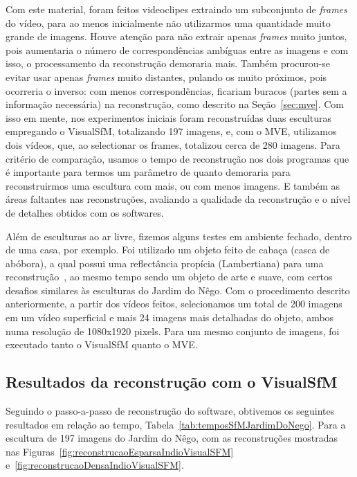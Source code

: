 Com este material, foram feitos videoclipes extraindo um subconjunto de
\emph{frames} do vídeo, para ao menos inicialmente não utilizarmos uma quantidade muito
grande de imagens. Houve atenção para não extrair apenas \emph{frames} muito
juntos, pois aumentaria o número de correspondências ambíguas entre as imagens e
com isso, o processamento da reconstrução demoraria mais. Também procurou-se 
evitar usar apenas \emph{frames} muito distantes, pulando os muito próximos,
pois ocorreria o inverso: com menos
correspondências, ficariam buracos (partes sem a informação necessária) na
reconstrução, como descrito na Seção~\ref{sec:mve}.
Com isso em mente, nos experimentos iniciais foram reconstruídas duas esculturas
empregando o VisualSfM, totalizando 197 imagens, 
%
%
e, com o MVE, utilizamos dois vídeos, que, ao selectionar os frames, totalizou cerca de 280
imagens.
Para critério de comparação, usamos o tempo de reconstrução nos dois programas que é importante para termos um parâmetro de quanto demoraria para reconstruirmos uma escultura com mais, ou com menos imagens. E também as áreas faltantes nas reconstruções, avaliando a qualidade da reconstrução e o nível de detalhes obtidos com os softwares.
%

Além de esculturas ao ar livre, fizemos alguns testes em ambiente fechado,
dentro de uma casa, por exemplo. Foi utilizado um objeto feito de cabaça (casca
de abóbora), a qual possui uma reflectância propícia
(Lambertiana) para uma reconstrução~\cite{basri2003lambertian}, ao mesmo tempo
sendo um objeto de arte e suave, com certos desafios similares às esculturas do
Jardim do Nêgo.  Com o procedimento descrito anteriormente, a partir dos vídeos
feitos, selecionamos um total de 200 imagens em um vídeo superficial e mais 24
imagens mais detalhadas do objeto, ambos numa resolução de 1080x1920 pixels. 
Para um mesmo conjunto de imagens, foi executado tanto o VisualSfM quanto o MVE.


\subsection{Resultados da reconstrução com o VisualSfM}

Seguindo o passo-a-passo de reconstrução do software, obtivemos os seguintes
resultados em relação ao tempo, Tabela~\ref{tab:temposSfMJardimDoNego}. Para a escultura de
197 imagens do Jardim do Nêgo, com as reconstruções mostradas nas
Figuras~\ref{fig:reconstrucaoEsparsaIndioVisualSFM} e~\ref{fig:reconstrucaoDensaIndioVisualSFM}.

